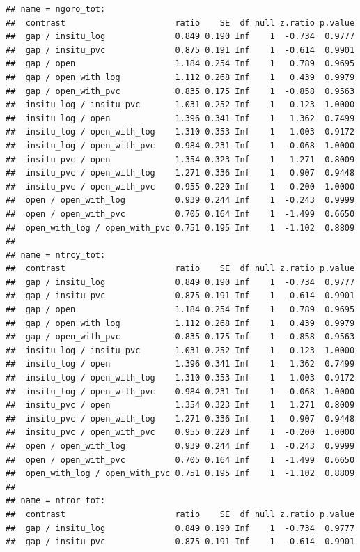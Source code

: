 \documentclass[
]{article}
\begin{document}
\begin{verbatim}
## name = ngoro_tot:
##  contrast                      ratio    SE  df null z.ratio p.value
##  gap / insitu_log              0.849 0.190 Inf    1  -0.734  0.9777
##  gap / insitu_pvc              0.875 0.191 Inf    1  -0.614  0.9901
##  gap / open                    1.184 0.254 Inf    1   0.789  0.9695
##  gap / open_with_log           1.112 0.268 Inf    1   0.439  0.9979
##  gap / open_with_pvc           0.835 0.175 Inf    1  -0.858  0.9563
##  insitu_log / insitu_pvc       1.031 0.252 Inf    1   0.123  1.0000
##  insitu_log / open             1.396 0.341 Inf    1   1.362  0.7499
##  insitu_log / open_with_log    1.310 0.353 Inf    1   1.003  0.9172
##  insitu_log / open_with_pvc    0.984 0.231 Inf    1  -0.068  1.0000
##  insitu_pvc / open             1.354 0.323 Inf    1   1.271  0.8009
##  insitu_pvc / open_with_log    1.271 0.336 Inf    1   0.907  0.9448
##  insitu_pvc / open_with_pvc    0.955 0.220 Inf    1  -0.200  1.0000
##  open / open_with_log          0.939 0.244 Inf    1  -0.243  0.9999
##  open / open_with_pvc          0.705 0.164 Inf    1  -1.499  0.6650
##  open_with_log / open_with_pvc 0.751 0.195 Inf    1  -1.102  0.8809
## 
## name = ntrcy_tot:
##  contrast                      ratio    SE  df null z.ratio p.value
##  gap / insitu_log              0.849 0.190 Inf    1  -0.734  0.9777
##  gap / insitu_pvc              0.875 0.191 Inf    1  -0.614  0.9901
##  gap / open                    1.184 0.254 Inf    1   0.789  0.9695
##  gap / open_with_log           1.112 0.268 Inf    1   0.439  0.9979
##  gap / open_with_pvc           0.835 0.175 Inf    1  -0.858  0.9563
##  insitu_log / insitu_pvc       1.031 0.252 Inf    1   0.123  1.0000
##  insitu_log / open             1.396 0.341 Inf    1   1.362  0.7499
##  insitu_log / open_with_log    1.310 0.353 Inf    1   1.003  0.9172
##  insitu_log / open_with_pvc    0.984 0.231 Inf    1  -0.068  1.0000
##  insitu_pvc / open             1.354 0.323 Inf    1   1.271  0.8009
##  insitu_pvc / open_with_log    1.271 0.336 Inf    1   0.907  0.9448
##  insitu_pvc / open_with_pvc    0.955 0.220 Inf    1  -0.200  1.0000
##  open / open_with_log          0.939 0.244 Inf    1  -0.243  0.9999
##  open / open_with_pvc          0.705 0.164 Inf    1  -1.499  0.6650
##  open_with_log / open_with_pvc 0.751 0.195 Inf    1  -1.102  0.8809
## 
## name = ntror_tot:
##  contrast                      ratio    SE  df null z.ratio p.value
##  gap / insitu_log              0.849 0.190 Inf    1  -0.734  0.9777
##  gap / insitu_pvc              0.875 0.191 Inf    1  -0.614  0.9901

\end{verbatim}
\end{document}

